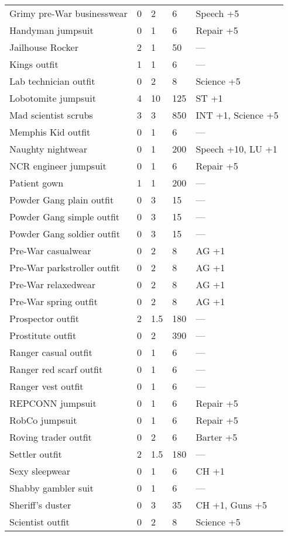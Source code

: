 \begin{longtable}{|p{4cm}|p{1.2cm}|p{1.2cm}|p{1.2cm}|p{4cm}|}
Grimy pre-War businesswear & 0 & 2 & 6 & Speech +5 \\
Handyman jumpsuit & 0 & 1 & 6 & Repair +5 \\
Jailhouse Rocker & 2 & 1 & 50 & — \\
Kings outfit & 1 & 1 & 6 & — \\
Lab technician outfit & 0 & 2 & 8 & Science +5 \\
Lobotomite jumpsuit & 4 & 10 & 125 & ST +1 \\
Mad scientist scrubs & 3 & 3 & 850 & INT +1, Science +5 \\
Memphis Kid outfit & 0 & 1 & 6 & — \\
Naughty nightwear & 0 & 1 & 200 & Speech +10, LU +1 \\
NCR engineer jumpsuit & 0 & 1 & 6 & Repair +5 \\
Patient gown & 1 & 1 & 200 & — \\
Powder Gang plain outfit & 0 & 3 & 15 & — \\
Powder Gang simple outfit & 0 & 3 & 15 & — \\
Powder Gang soldier outfit & 0 & 3 & 15 & — \\
Pre-War casualwear & 0 & 2 & 8 & AG +1 \\
Pre-War parkstroller outfit & 0 & 2 & 8 & AG +1 \\
Pre-War relaxedwear & 0 & 2 & 8 & AG +1 \\
Pre-War spring outfit & 0 & 2 & 8 & AG +1 \\
Prospector outfit & 2 & 1.5 & 180 & — \\
Prostitute outfit & 0 & 2 & 390 & — \\
Ranger casual outfit & 0 & 1 & 6 & — \\
Ranger red scarf outfit & 0 & 1 & 6 & — \\
Ranger vest outfit & 0 & 1 & 6 & — \\
REPCONN jumpsuit & 0 & 1 & 6 & Repair +5 \\
RobCo jumpsuit & 0 & 1 & 6 & Repair +5 \\
Roving trader outfit & 0 & 2 & 6 & Barter +5 \\
Settler outfit & 2 & 1.5 & 180 & — \\
Sexy sleepwear & 0 & 1 & 6 & CH +1 \\
Shabby gambler suit & 0 & 1 & 6 & — \\
Sheriff's duster & 0 & 3 & 35 & CH +1, Guns +5 \\
Scientist outfit & 0 & 2 & 8 & Science +5 \\

\end{longtable}
